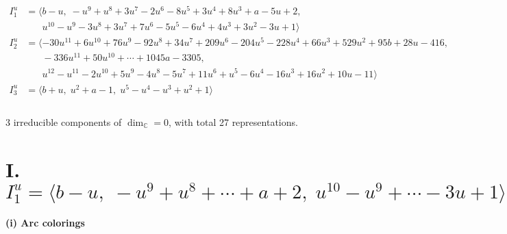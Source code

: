 \documentclass[1p]{elsarticle_modified}
\theoremstyle{definition}
\begin{document}
\begin{align*}
I^u_{1}&=\langle 
b- u,\;- u^9+u^8+3 u^7-2 u^6-8 u^5+3 u^4+8 u^3+a-5 u+2,\\
\phantom{I^u_{1}}&\phantom{= \langle  }u^{10}- u^9-3 u^8+3 u^7+7 u^6-5 u^5-6 u^4+4 u^3+3 u^2-3 u+1\rangle \\
I^u_{2}&=\langle 
-30 u^{11}+6 u^{10}+76 u^9-92 u^8+34 u^7+209 u^6-204 u^5-228 u^4+66 u^3+529 u^2+95 b+28 u-416,\\
\phantom{I^u_{2}}&\phantom{= \langle  }-336 u^{11}+50 u^{10}+\cdots+1045 a-3305,\\
\phantom{I^u_{2}}&\phantom{= \langle  }u^{12}- u^{11}-2 u^{10}+5 u^9-4 u^8-5 u^7+11 u^6+u^5-6 u^4-16 u^3+16 u^2+10 u-11\rangle \\
I^u_{3}&=\langle 
b+u,\;u^2+a-1,\;u^5- u^4- u^3+u^2+1\rangle \\
\\
\end{align*}
\raggedright * 3 irreducible components of $\dim_{\mathbb{C}}=0$, with total 27 representations.\\
\newpage
\renewcommand{\arraystretch}{1}
\centering \section*{I. $I^u_{1}= \langle b- u,\;- u^9+u^8+\cdots+a+2,\;u^{10}- u^9+\cdots-3 u+1 \rangle$}
\flushleft \textbf{(i) Arc colorings}\\
\end{document}
